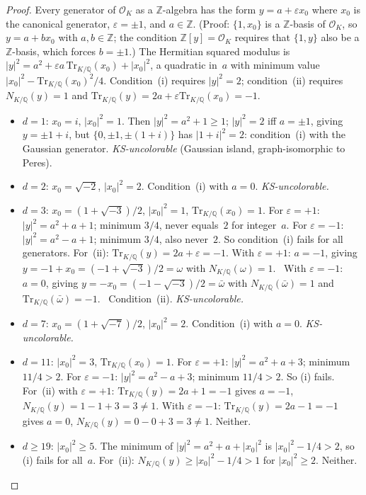 \documentclass[12pt,a4paper]{article}
\newcommand{\Z}{\mathbb{Z}}
\newcommand{\Q}{\mathbb{Q}}
\newcommand{\Norm}[1]{N_{K/\Q}\!\left(#1\right)}
\newcommand{\Tr}[1]{\mathrm{Tr}_{K/\Q}\!\left(#1\right)}
\begin{document}
\begin{proof}
Every generator of $\mathcal{O}_K$ as a $\Z$-algebra has the form
$y = a + \varepsilon x_0$ where $x_0$ is the canonical generator,
$\varepsilon = \pm 1$, and $a \in \Z$.  (Proof: $\{1, x_0\}$ is a
$\Z$-basis of $\mathcal{O}_K$, so $y = a + bx_0$ with $a, b \in \Z$;
the condition $\Z[y] = \mathcal{O}_K$ requires that $\{1, y\}$ also
be a $\Z$-basis, which forces $b = \pm 1$.)  The Hermitian squared modulus
is $|y|^2 = a^2 + \varepsilon a \, \Tr{x_0} + |x_0|^2$, a quadratic
in~$a$ with minimum value $|x_0|^2 - \Tr{x_0}^2/4$.  Condition~(i)
requires $|y|^2 = 2$; condition~(ii) requires $\Norm{y} = 1$ and
$\Tr{y} = 2a + \varepsilon \Tr{x_0} = -1$.

\begin{itemize}
\item $d = 1$: $x_0 = i$, $|x_0|^2 = 1$.  Then
  $|y|^2 = a^2 + 1 \geq 1$; $|y|^2 = 2$ iff $a = \pm 1$, giving
  $y = \pm 1 + i$, but $\{0, \pm 1, \pm(1{+}i)\}$ has $|1{+}i|^2 = 2$:
  condition~(i) with the Gaussian generator.
  \emph{KS-uncolorable} (Gaussian island, graph-isomorphic to Peres).
\item $d = 2$: $x_0 = \sqrt{-2}$, $|x_0|^2 = 2$.
  Condition~(i) with $a = 0$. \emph{KS-uncolorable.}
\item $d = 3$: $x_0 = (1{+}\sqrt{-3})/2$, $|x_0|^2 = 1$,
  $\Tr{x_0} = 1$.  For $\varepsilon = +1$: $|y|^2 = a^2 + a + 1$;
  minimum $3/4$, never equals~$2$ for integer~$a$.
  For $\varepsilon = -1$: $|y|^2 = a^2 - a + 1$; minimum $3/4$,
  also never~$2$.  So condition~(i) fails for all generators.
  For~(ii): $\Tr{y} = 2a + \varepsilon = -1$.
  With $\varepsilon = +1$: $a = -1$, giving $y = -1 + x_0 =
  (-1{+}\sqrt{-3})/2 = \omega$ with $\Norm{\omega} = 1$. \checkmark\
  With $\varepsilon = -1$: $a = 0$, giving $y = -x_0 =
  (-1{-}\sqrt{-3})/2 = \bar\omega$ with $\Norm{\bar\omega} = 1$
  and $\Tr{\bar\omega} = -1$. \checkmark\
  Condition~(ii). \emph{KS-uncolorable.}
\item $d = 7$: $x_0 = (1{+}\sqrt{-7})/2$, $|x_0|^2 = 2$.
  Condition~(i) with $a = 0$. \emph{KS-uncolorable.}
\item $d = 11$: $|x_0|^2 = 3$, $\Tr{x_0} = 1$.
  For $\varepsilon = +1$: $|y|^2 = a^2 + a + 3$; minimum $11/4 > 2$.
  For $\varepsilon = -1$: $|y|^2 = a^2 - a + 3$; minimum $11/4 > 2$.
  So (i) fails.  For~(ii) with $\varepsilon = +1$: $\Tr{y} = 2a + 1
  = -1$ gives $a = -1$, $\Norm{y} = 1 - 1 + 3 = 3 \neq 1$.
  With $\varepsilon = -1$: $\Tr{y} = 2a - 1 = -1$ gives $a = 0$,
  $\Norm{y} = 0 - 0 + 3 = 3 \neq 1$.  Neither.
\item $d \geq 19$: $|x_0|^2 \geq 5$.  The minimum of
  $|y|^2 = a^2 + a + |x_0|^2$ is $|x_0|^2 - 1/4 > 2$, so (i) fails
  for all~$a$.  For~(ii): $\Norm{y} \geq |x_0|^2 - 1/4 > 1$ for
  $|x_0|^2 \geq 2$.  Neither.
\end{itemize}
\end{proof}
\end{document}
